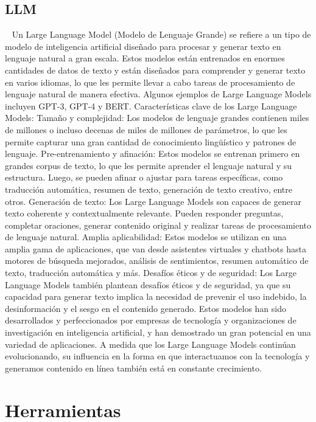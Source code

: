 \subsection{LLM}~\cite{mirchandani2023large}
Un Large Language Model (Modelo de Lenguaje Grande) se refiere a un tipo de modelo de inteligencia artificial diseñado para procesar y generar texto en lenguaje natural a gran escala. Estos modelos están entrenados en enormes cantidades de datos de texto y están diseñados para comprender y generar texto en varios idiomas, lo que les permite llevar a cabo tareas de procesamiento de lenguaje natural de manera efectiva. Algunos ejemplos de Large Language Models incluyen GPT-3, GPT-4 y BERT.
Características clave de los Large Language Models:
Tamaño y complejidad: Los modelos de lenguaje grandes contienen miles de millones o incluso decenas de miles de millones de parámetros, lo que les permite capturar una gran cantidad de conocimiento lingüístico y patrones de lenguaje.
Pre-entrenamiento y afinación: Estos modelos se entrenan primero en grandes corpus de texto, lo que les permite aprender el lenguaje natural y su estructura. Luego, se pueden afinar o ajustar para tareas específicas, como traducción automática, resumen de texto, generación de texto creativo, entre otros.
Generación de texto: Los Large Language Models son capaces de generar texto coherente y contextualmente relevante. Pueden responder preguntas, completar oraciones, generar contenido original y realizar tareas de procesamiento de lenguaje natural.
Amplia aplicabilidad: Estos modelos se utilizan en una amplia gama de aplicaciones, que van desde asistentes virtuales y chatbots hasta motores de búsqueda mejorados, análisis de sentimientos, resumen automático de texto, traducción automática y más.
Desafíos éticos y de seguridad: Los Large Language Models también plantean desafíos éticos y de seguridad, ya que su capacidad para generar texto implica la necesidad de prevenir el uso indebido, la desinformación y el sesgo en el contenido generado.
Estos modelos han sido desarrollados y perfeccionados por empresas de tecnología y organizaciones de investigación en inteligencia artificial, y han demostrado un gran potencial en una variedad de aplicaciones. A medida que los Large Language Models continúan evolucionando, su influencia en la forma en que interactuamos con la tecnología y generamos contenido en línea también está en constante crecimiento.


\section{Herramientas}

